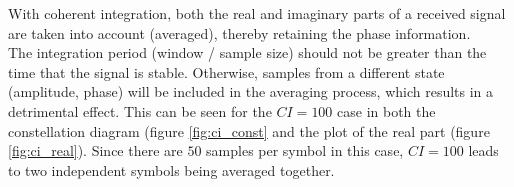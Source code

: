 
With coherent integration, both the real and imaginary parts of a received signal are taken into account (averaged), thereby retaining the phase information. \cite{hysell_radar}\cite{richards_pdf}\\

The integration period (window / sample size) should not be greater than the time that the signal is stable. Otherwise, samples from a different state (amplitude, phase) will be included in the averaging process, which results in a detrimental effect. This can be seen for the $CI=100$ case in both the constellation diagram (figure \ref{fig:ci_const} and the plot of the real part (figure \ref{fig:ci_real}). Since there are $50$ samples per symbol in this case, $CI=100$ leads to two independent symbols being averaged together.\\

